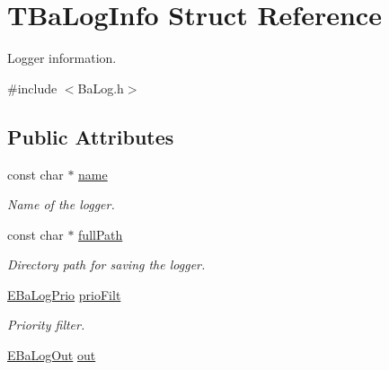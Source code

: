 \hypertarget{structTBaLogInfo}{}\section{T\+Ba\+Log\+Info Struct Reference}
\label{structTBaLogInfo}


Logger information.  




{\ttfamily \#include $<$Ba\+Log.\+h$>$}

\subsection*{Public Attributes}
\begin{DoxyCompactItemize}
\item 
const char $\ast$ \hyperlink{structTBaLogInfo_a6fe0471fbe5aee2253366cd72f3fcfd2}{name}\hypertarget{structTBaLogInfo_a6fe0471fbe5aee2253366cd72f3fcfd2}{}\label{structTBaLogInfo_a6fe0471fbe5aee2253366cd72f3fcfd2}

\begin{DoxyCompactList}\small\item\em Name of the logger. \end{DoxyCompactList}\item 
const char $\ast$ \hyperlink{structTBaLogInfo_aad77a8e412b731cb1f746fc2eec116a3}{full\+Path}\hypertarget{structTBaLogInfo_aad77a8e412b731cb1f746fc2eec116a3}{}\label{structTBaLogInfo_aad77a8e412b731cb1f746fc2eec116a3}

\begin{DoxyCompactList}\small\item\em Directory path for saving the logger. \end{DoxyCompactList}\item 
\hyperlink{BaLog_8h_ab14f00a81932b8b62d2e8c4a2d7e3916}{E\+Ba\+Log\+Prio} \hyperlink{structTBaLogInfo_a756157c50cdaf559e7e4705a9644d926}{prio\+Filt}\hypertarget{structTBaLogInfo_a756157c50cdaf559e7e4705a9644d926}{}\label{structTBaLogInfo_a756157c50cdaf559e7e4705a9644d926}

\begin{DoxyCompactList}\small\item\em Priority filter. \end{DoxyCompactList}\item 
\hyperlink{BaLog_8h_a1f5f5789212a206b457c4446abaf81c4}{E\+Ba\+Log\+Out} \hyperlink{structTBaLogInfo_af72f79042561752b9a55b2429374d6e6}{out}\hypertarget{structTBaLogInfo_af72f79042561752b9a55b2429374d6e6}{}\label{structTBaLogInfo_af72f79042561752b9a55b2429374d6e6}


\end{DoxyCompactItemize}
